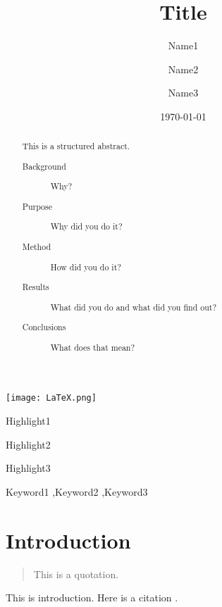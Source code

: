 \documentclass[
preprint, %
10pt,
oneside,
onecolumn, 1p,
authoryear, %
times,
]{elsarticle}
\begin{document}
\begin{frontmatter}
\title{Title}

\author[1]{Name1}
\author[2]{Name2}
\author[1]{Name3}


\date{\today}

\begin{abstract}
This is a structured abstract.
\begin{description}
\item[Background] Why?
\item[Purpose] Why did you do it?
\item[Method] How did you do it?
\item[Results] What did you do and what did you find out?
\item[Conclusions] What does that mean?
\end{description}
\end{abstract}

\begin{graphicalabstract}
	\texttt{[image: LaTeX.png]}
\end{graphicalabstract}

\begin{highlights}
\item Highlight1
\item Highlight2
\item Highlight3
\end{highlights}

\begin{keyword}
Keyword1 \sep Keyword2 \sep Keyword3
\end{keyword}

\end{frontmatter}

\section{Introduction}
\begin{quotation}
This is a quotation.
\end{quotation}
This is introduction. Here is a citation \cite{PhysRevB.78.104104}.
\end{document}
